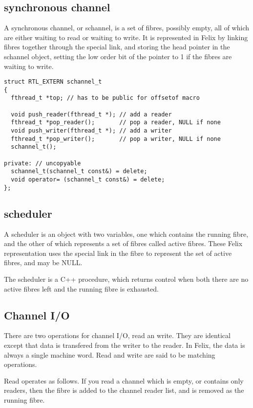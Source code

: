 \documentclass[oneside]{book}
\begin{document}
\subsection{synchronous channel}
A synchronous channel, or schannel, is a set of fibres, possibly empty,
all of which are either waiting to read or waiting to write. It is represented
in Felix by linking fibres together through the special link, and storing
the head pointer in the schannel object, setting the low order bit of the
pointer to 1 if the fibres are waiting to write.

\begin{verbatim}
struct RTL_EXTERN schannel_t
{
  fthread_t *top; // has to be public for offsetof macro

  void push_reader(fthread_t *); // add a reader
  fthread_t *pop_reader();       // pop a reader, NULL if none
  void push_writer(fthread_t *); // add a writer
  fthread_t *pop_writer();       // pop a writer, NULL if none
  schannel_t();

private: // uncopyable
  schannel_t(schannel_t const&) = delete;
  void operator= (schannel_t const&) = delete;
};
\end{verbatim}

\subsection{scheduler}
A scheduler is an object with two variables, one which contains
the running fibre, and the other of which represents a set of fibres
called active fibres. These Felix representation uses the special link
in the fibre to represent the set of active fibres, and may be NULL.

The scheduler is a C++ procedure, which returns control when both there
are no active fibres left and the running fibre is exhausted.

\subsection{Channel I/O}
There are two operations for channel I/O, read an write.
They are identical except that data is transfered from the writer
to the reader. In Felix, the data is always a single machine word.
Read and write are said to be matching operations.

Read operates as follows. If you read a channel which is empty,
or contains only readers, then the fibre is added to the channel
reader list, and is removed as the running fibre.
\end{document}
